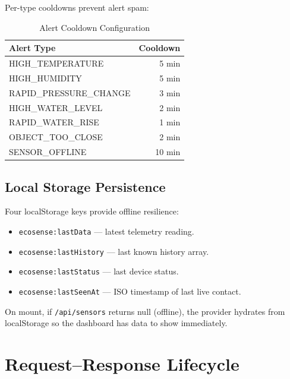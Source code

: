 Per-type cooldowns prevent alert spam:

\begin{table}[H]
\centering
\caption{Alert Cooldown Configuration}
\begin{tabular}{|l|r|}
\hline
\rowcolor{FloodLight}
\textbf{Alert Type} & \textbf{Cooldown} \\
\hline
HIGH\_TEMPERATURE & 5 min \\
HIGH\_HUMIDITY & 5 min \\
RAPID\_PRESSURE\_CHANGE & 3 min \\
HIGH\_WATER\_LEVEL & 2 min \\
RAPID\_WATER\_RISE & 1 min \\
OBJECT\_TOO\_CLOSE & 2 min \\
SENSOR\_OFFLINE & 10 min \\
\hline
\end{tabular}
\end{table}

\subsection{Local Storage Persistence}

Four localStorage keys provide offline resilience:
\begin{itemize}[leftmargin=1.5em]
  \item \texttt{ecosense:lastData} — latest telemetry reading.
  \item \texttt{ecosense:lastHistory} — last known history array.
  \item \texttt{ecosense:lastStatus} — last device status.
  \item \texttt{ecosense:lastSeenAt} — ISO timestamp of last live contact.
\end{itemize}

On mount, if \texttt{/\allowbreak{}api/\allowbreak{}sensors} returns null (offline), the provider hydrates from localStorage so the dashboard has data to show immediately.

\section{Request–Response Lifecycle}

